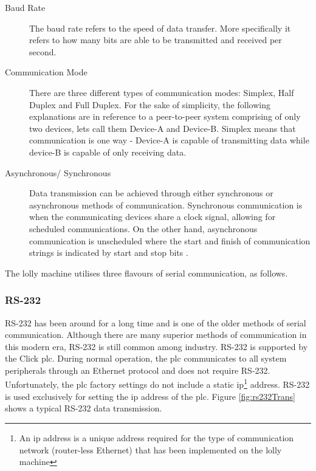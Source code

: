     \begin{description}
    
    \item[Baud Rate] The baud rate refers to the speed of data transfer. More specifically it refers to how many bits are able to be transmitted and received per second. 
    
    \item[Communication Mode] There are three different types of communication modes: Simplex, Half Duplex and Full Duplex. For the sake of simplicity, the following explanations are in reference to a peer-to-peer system comprising of only two devices, lets call them Device-A and Device-B. Simplex means that communication is one way - Device-A is capable of transmitting data while device-B is capable of only receiving data.
    
    \item[Asynchronous/ Synchronous] Data transmission can be achieved through either synchronous or asynchronous methods of communication. Synchronous communication is when the communicating devices share a clock signal, allowing for scheduled communications. On the other hand, asynchronous communication is unscheduled where the start and finish of communication strings is indicated by start and stop bits \cite{frenzel2015handbook}. 
    
    \end{description}
    
    The lolly machine utilises three flavours of serial communication, as follows.
    
    \subsubsection{RS-232}
    RS-232 has been around for a long time and is one of the older methods of serial communication. Although there are many superior methods of communication in this modern era, RS-232 is still common among industry. 
    RS-232 is supported by the Click \acrshort{plc}. During normal operation, the \acrshort{plc} communicates to all system peripherals through an Ethernet protocol and does not require RS-232. Unfortunately, the \acrshort{plc} factory settings do not include a static \acrshort{ip}\footnote{An \acrshort{ip} address is a unique address required for the type of communication network (router-less Ethernet) that has been implemented on the lolly machine} address.  RS-232 is used exclusively for setting the \acrshort{ip} address of the \acrshort{plc}. Figure \ref{fig:rs232Trans} shows a typical RS-232 data transmission. 

